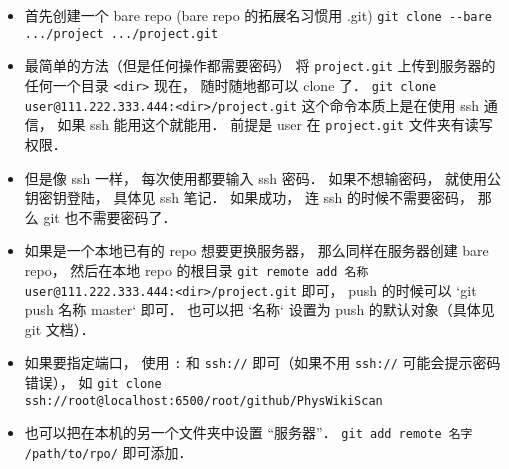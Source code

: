 
\begin{issues}
\issueDraft
\end{issues}


\begin{itemize}
\item 首先创建一个 bare repo (bare repo 的拓展名习惯用 .git)
\verb|git clone --bare .../project .../project.git|

\item 最简单的方法（但是任何操作都需要密码）
将 \verb|project.git| 上传到服务器的任何一个目录 \verb|<dir>|
现在， 随时随地都可以 clone 了．
\verb`git clone user@111.222.333.444:<dir>/project.git`
这个命令本质上是在使用 ssh 通信， 如果 ssh 能用这个就能用．
前提是 user 在 \verb|project.git| 文件夹有读写权限．

\item 但是像 ssh 一样， 每次使用都要输入 ssh 密码． 如果不想输密码， 就使用公钥密钥登陆， 具体见 ssh 笔记． 如果成功， 连 ssh 的时候不需要密码， 那么 git 也不需要密码了．

\item 如果是一个本地已有的 repo 想要更换服务器， 那么同样在服务器创建 bare repo， 然后在本地 repo 的根目录 \verb`git remote add 名称 user@111.222.333.444:<dir>/project.git` 即可， push 的时候可以 `git push 名称 master` 即可． 也可以把 `名称` 设置为 push 的默认对象（具体见 git 文档）．

\item 如果要指定端口， 使用 \verb`:` 和 \verb`ssh://` 即可（如果不用 \verb`ssh://` 可能会提示密码错误）， 如 \verb`git clone ssh://root@localhost:6500/root/github/PhysWikiScan`

\item 也可以把在本机的另一个文件夹中设置 “服务器”． \verb|git add remote 名字 /path/to/rpo/| 即可添加．
\end{itemize}
